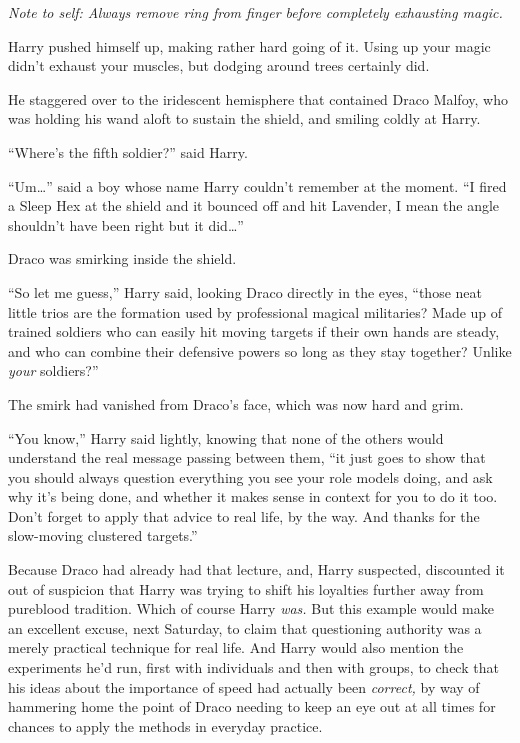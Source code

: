 \emph{Note to self: Always remove ring from finger before completely exhausting magic.}

Harry pushed himself up, making rather hard going of it. Using up your magic didn’t exhaust your muscles, but dodging around trees certainly did.

He staggered over to the iridescent hemisphere that contained Draco Malfoy, who was holding his wand aloft to sustain the shield, and smiling coldly at Harry.

“Where’s the fifth soldier?” said Harry.

“Um…” said a boy whose name Harry couldn’t remember at the moment. “I fired a Sleep Hex at the shield and it bounced off and hit Lavender, I mean the angle shouldn’t have been right but it did…”

Draco was smirking inside the shield.

“So let me guess,” Harry said, looking Draco directly in the eyes, “those neat little trios are the formation used by professional magical militaries? Made up of trained soldiers who can easily hit moving targets if their own hands are steady, and who can combine their defensive powers so long as they stay together? Unlike \emph{your} soldiers?”

The smirk had vanished from Draco’s face, which was now hard and grim.

“You know,” Harry said lightly, knowing that none of the others would understand the real message passing between them, “it just goes to show that you should always question everything you see your role models doing, and ask why it’s being done, and whether it makes sense in context for you to do it too. Don’t forget to apply that advice to real life, by the way. And thanks for the slow-moving clustered targets.”

Because Draco had already had that lecture, and, Harry suspected, discounted it out of suspicion that Harry was trying to shift his loyalties further away from pureblood tradition. Which of course Harry \emph{was.} But this example would make an excellent excuse, next Saturday, to claim that questioning authority was a merely practical technique for real life. And Harry would also mention the experiments he’d run, first with individuals and then with groups, to check that his ideas about the importance of speed had actually been \emph{correct,} by way of hammering home the point of Draco needing to keep an eye out at all times for chances to apply the methods in everyday practice.

